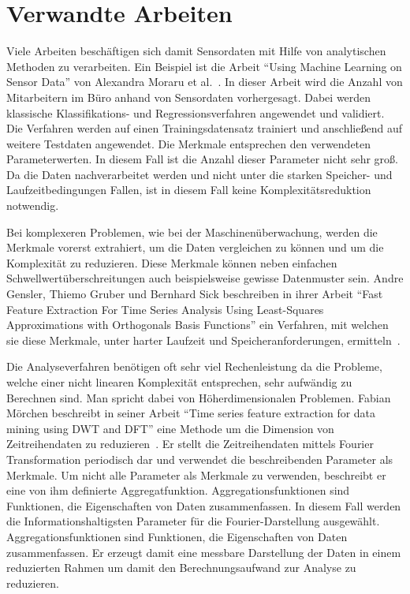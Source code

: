 \section{Verwandte Arbeiten}
Viele Arbeiten  beschäftigen sich damit Sensordaten mit Hilfe von analytischen Methoden zu verarbeiten. 
Ein Beispiel ist die Arbeit \enquote{Using Machine Learning on Sensor Data} von Alexandra Moraru et al.~\cite{moraru2010using}. 
In dieser Arbeit wird die Anzahl von Mitarbeitern im Büro anhand von Sensordaten vorhergesagt.
Dabei werden klassische Klassifikations- und Regressionsverfahren angewendet und validiert. 
Die Verfahren werden auf einen Trainingsdatensatz trainiert und anschließend auf weitere Testdaten angewendet. 
Die Merkmale entsprechen den verwendeten Parameterwerten. 
In diesem Fall ist die Anzahl dieser Parameter nicht sehr groß. 
Da die Daten nachverarbeitet werden und nicht unter die starken Speicher- und Laufzeitbedingungen Fallen, ist in diesem Fall keine Komplexitätsreduktion notwendig.

Bei komplexeren Problemen, wie bei der Maschinenüberwachung, werden die Merkmale vorerst extrahiert, um die Daten vergleichen zu können und um die Komplexität zu reduzieren.  
Diese Merkmale können neben einfachen Schwellwertüberschreitungen auch beispielsweise gewisse Datenmuster sein. 
Andre Gensler, Thiemo Gruber und Bernhard Sick beschreiben in ihrer Arbeit \enquote{Fast Feature Extraction For Time Series Analysis Using Least-Squares Approximations with Orthogonals Basis Functions} ein Verfahren, mit welchen sie diese Merkmale, unter harter Laufzeit und Speicheranforderungen, ermitteln~\cite{gensler2015fast}. 

Die Analyseverfahren benötigen oft sehr viel Rechenleistung da die Probleme, welche einer nicht linearen Komplexität entsprechen, sehr aufwändig zu Berechnen sind. 
Man spricht dabei von Höherdimensionalen Problemen. 
Fabian Mörchen beschreibt in seiner Arbeit \enquote{Time series feature extraction for data mining using DWT and DFT} eine Methode um die Dimension von Zeitreihendaten zu reduzieren~\cite{morchen2003time}. 
Er stellt die Zeitreihendaten mittels Fourier Transformation periodisch dar und verwendet die beschreibenden Parameter als Merkmale.
Um nicht alle Parameter als Merkmale zu verwenden, beschreibt er eine von ihm definierte Aggregatfunktion.
Aggregationsfunktionen sind Funktionen, die Eigenschaften von Daten zusammenfassen.  
In diesem Fall werden die Informationshaltigsten Parameter für die Fourier-Darstellung ausgewählt.
Aggregationsfunktionen sind Funktionen, die Eigenschaften von Daten zusammenfassen.  
Er erzeugt damit eine messbare Darstellung der Daten in einem reduzierten Rahmen um damit den Berechnungsaufwand zur Analyse zu reduzieren.

